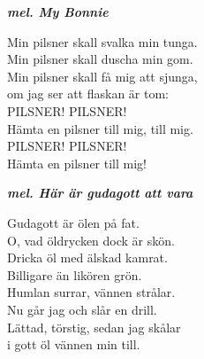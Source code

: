 \documentclass[a6paper,10pt]{article}
\newcommand{\mel}[1]{\small\textbf{\textit{mel. #1 \\}}}
\begin{document}
\setlength{\oddsidemargin}{-0.37in}
\begin{center}
    \mel{My Bonnie}
\end{center}
\begin{lyrics}
Min pilsner skall svalka min tunga. \\
Min pilsner skall duscha min gom. \\
Min pilsner skall få mig att sjunga, \\
om jag ser att flaskan är tom: \\
\newline
PILSNER! PILSNER! \\
Hämta en pilsner till mig, till mig. \\
PILSNER! PILSNER! \\
Hämta en pilsner till mig!
\end{lyrics}
\vspace{40pt}
\begin{center}
    \mel{Här är gudagott att vara}
\end{center}
\begin{lyrics}
Gudagott är ölen på fat. \\
O, vad öldrycken dock är skön. \\
Dricka öl med älskad kamrat. \\
Billigare än likören grön. \\
Humlan surrar, vännen strålar. \\
Nu går jag och slår en drill. \\
Lättad, törstig, sedan jag skålar \\
i gott öl vännen min till. 
\end{lyrics}
\end{document}
